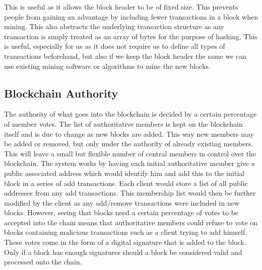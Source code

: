 \documentclass[11pt]{article}
\begin{document}

This is useful as it allows the block header to be of fixed size. This prevents people from gaining an advantage by including fewer transactions in a block when mining. This also abstracts the underlying transaction structure as any transaction is simply treated as an array of bytes for the purpose of hashing. This is useful, especially for us as it does not require us to define all types of transactions beforehand, but also if we keep the block header the same we can use existing mining software or algorithms to mine the new blocks.

\subsection{Blockchain Authority}\label{subsec:authority}

The authority of what goes into the blockchain is decided by a certain percentage of member votes. The list of authoritative members is kept on the blockchain itself and is due to change as new blocks are added. This way new members may be added or removed, but only under the authority of already existing members. This will leave a small but flexible number of central members in control over the blockchain. The system works by having each initial authoritative member give a public associated address which would identify him and add this to the initial block in a series of add transactions. Each client would store a list of all public addresses from any add transactions. This membership list would then be further modified by the client as any add/remove transactions were included in new blocks. However, seeing that blocks need a certain percentage of votes to be accepted into the chain means that authoritative members could refuse to vote on blocks containing malicious transactions such as a client trying to add himself. These votes come in the form of a digital signature that is added to the block. Only if a block has enough signatures should a block be considered valid and processed onto the chain. 

\end{document}
